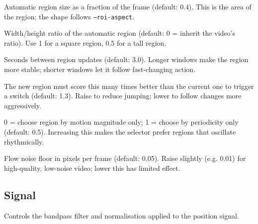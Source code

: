\documentclass[11pt,a4paper]{article}
\newcommand{\code}[1]{\texttt{#1}}
\begin{document}
\begin{description}[leftmargin=3.5cm, style=nextline]
  \item[\code{--roi}] Automatic region size as a fraction of the frame (default: 0.4). This is the area of the region; the shape follows \code{--roi-aspect}.
  \item[\code{--roi-aspect}] Width/height ratio of the automatic region (default: 0 = inherit the video's ratio). Use 1 for a square region, 0.5 for a tall region.
  \item[\code{--roi-window}] Seconds between region updates (default: 3.0). Longer windows make the region more stable; shorter windows let it follow fast-changing action.
  \item[\code{--switch}] The new region must score this many times better than the current one to trigger a switch (default: 1.3). Raise to reduce jumping; lower to follow changes more aggressively.
  \item[\code{--period-weight}] 0 = choose region by motion magnitude only; 1 = choose by periodicity only (default: 0.5). Increasing this makes the selector prefer regions that oscillate rhythmically.
  \item[\code{--noise}] Flow noise floor in pixels per frame (default: 0.05). Raise slightly (e.g. 0.01) for high-quality, low-noise video; lower this has limited effect.
\end{description}

\subsection{Signal}

Controls the bandpass filter and normalisation applied to the position signal.
\end{document}
